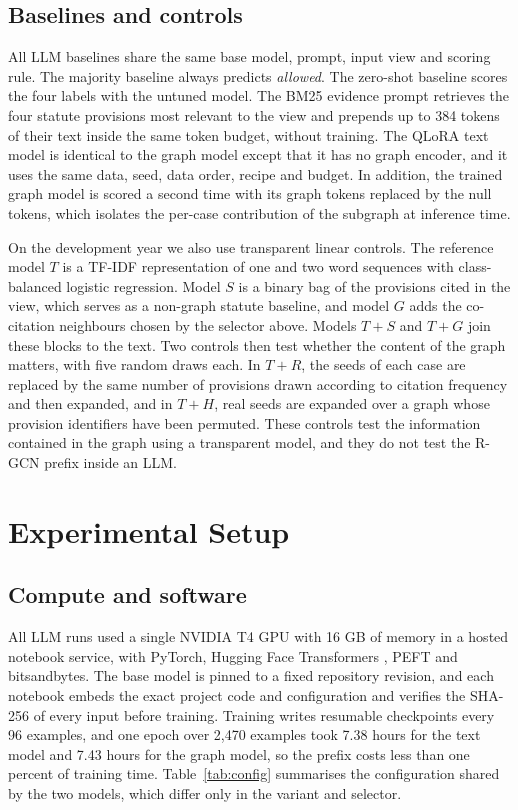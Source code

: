 \documentclass[11pt,a4paper]{article}
\newcommand{\cls}[1]{\emph{#1}}
\begin{document}
\subsection{Baselines and controls}
All LLM baselines share the same base model, prompt, input view and scoring rule. The majority baseline always predicts \cls{allowed}. The zero-shot baseline scores the four labels with the untuned model. The BM25 evidence prompt retrieves the four statute provisions most relevant to the view \cite{r63} and prepends up to 384 tokens of their text inside the same token budget, without training. The QLoRA text model is identical to the graph model except that it has no graph encoder, and it uses the same data, seed, data order, recipe and budget. In addition, the trained graph model is scored a second time with its graph tokens replaced by the null tokens, which isolates the per-case contribution of the subgraph at inference time.

On the development year we also use transparent linear controls. The reference model $T$ is a TF-IDF representation of one and two word sequences with class-balanced logistic regression. Model $S$ is a binary bag of the provisions cited in the view, which serves as a non-graph statute baseline, and model $G$ adds the co-citation neighbours chosen by the selector above. Models $T{+}S$ and $T{+}G$ join these blocks to the text. Two controls then test whether the content of the graph matters, with five random draws each. In $T{+}R$, the seeds of each case are replaced by the same number of provisions drawn according to citation frequency and then expanded, and in $T{+}H$, real seeds are expanded over a graph whose provision identifiers have been permuted. These controls test the information contained in the graph using a transparent model, and they do not test the R-GCN prefix inside an LLM.

\section{Experimental Setup}\label{sec:setup}
\subsection{Compute and software}
All LLM runs used a single NVIDIA T4 GPU with 16 GB of memory in a hosted notebook service, with PyTorch, Hugging Face Transformers \cite{r64}, PEFT and bitsandbytes. The base model is pinned to a fixed repository revision, and each notebook embeds the exact project code and configuration and verifies the SHA-256 of every input before training. Training writes resumable checkpoints every 96 examples, and one epoch over 2,470 examples took 7.38 hours for the text model and 7.43 hours for the graph model, so the prefix costs less than one percent of training time. Table~\ref{tab:config} summarises the configuration shared by the two models, which differ only in the variant and selector.
\end{document}
